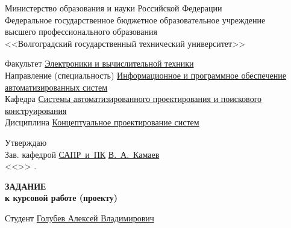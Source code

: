 \begin{titlepage}
    \begin{center}
        Министерство образования и науки Российской Федерации \\
        Федеральное государственное бюджетное образовательное учреждение\\
        высшего профессионального образования\\
        <<Волгоградский государственный технический университет>>\\
    \end{center}
    Факультет \underline{\hspace{1cm}Электроники и вычислительной техники\hspace{4.75cm}}\\
    Направление (специальность) \underline{Информационное и программное обеспечение\hspace{0.2cm}}\\
    \underline{автоматизированных систем\hspace{10.8cm}}\\
    Кафедра \underline{\hspace{1.4cm}Системы автоматизированного проектирования и поискового\hspace{0.3cm}}\\
    \underline{конструирования\hspace{13.3cm}}\\
    Дисциплина \underline{\hspace{1cm}Концептуальное проектирование систем}
    \begin{flushright}
        Утверждаю\\
        Зав. кафедрой \underline{САПР~и~ПК} \hspace{0.2cm} \underline{В.~А.~Камаев} \\
        <<\underline{\hspace{2cm}}>>\underline{\hspace{5cm}} \the{}.
    \end{flushright}
    \begin{center}
        \large \MakeUppercase{\textbf{задание}} \\
        \normalsize\vspace{-0.2cm}\textbf{к курсовой работе (проекту)}
    \end{center}
    Студент \underline{\hspace{1cm}Голубев Алексей Владимирович\hspace{2cm}} \\

\end{titlepage}
